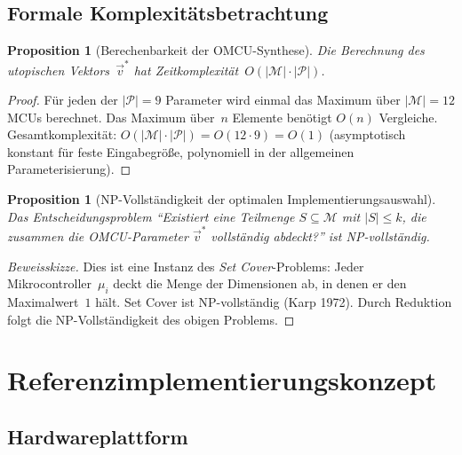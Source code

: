 ﻿\documentclass[12pt, a4paper]{article}
\theoremstyle{plain}
\newtheorem{proposition}[theorem]{Proposition}
\theoremstyle{definition}
\theoremstyle{remark}
\begin{document}
\subsection{Formale Komplexitätsbetrachtung}

\begin{proposition}[Berechenbarkeit der OMCU-Synthese]
\label{prop:komplexitaet}
  Die Berechnung des utopischen Vektors~$\vec{v}^*$ hat
  Zeitkomplexität~$O(|\mathcal{M}| \cdot |\mathcal{P}|)$.
\end{proposition}

\begin{proof}
  Für jeden der $|\mathcal{P}| = 9$ Parameter wird einmal das Maximum über
  $|\mathcal{M}| = 12$ MCUs berechnet. Das Maximum über~$n$ Elemente benötigt
  $O(n)$ Vergleiche. Gesamtkomplexität:
  $O(|\mathcal{M}| \cdot |\mathcal{P}|) = O(12 \cdot 9) = O(1)$
  (asymptotisch konstant für feste Eingabegröße, polynomiell in der
  allgemeinen Parameterisierung).
\end{proof}

\begin{proposition}[NP-Vollständigkeit der optimalen Implementierungsauswahl]
\label{prop:np_implementierung}
  Das Entscheidungsproblem
  ``Existiert eine Teilmenge $S \subseteq \mathcal{M}$ mit $|S| \le k$,
  die zusammen die OMCU-Parameter $\vec{v}^*$ vollständig abdeckt?''
  ist NP-vollständig.
\end{proposition}

\begin{proof}[Beweisskizze]
  Dies ist eine Instanz des \emph{Set Cover}-Problems:
  Jeder Mikrocontroller~$\mu_i$ deckt die Menge der Dimensionen ab, in
  denen er den Maximalwert~$1$ hält.
  Set Cover ist NP-vollständig (Karp 1972). Durch Reduktion folgt die
  NP-Vollständigkeit des obigen Problems.
 
\end{proof}

\section{Referenzimplementierungskonzept}
\label{sec:implementierung}

\subsection{Hardwareplattform}
\end{document}
